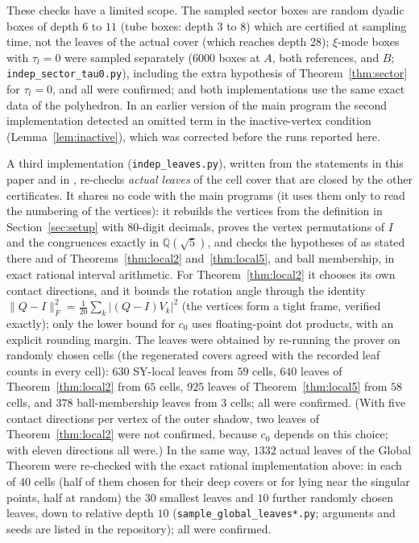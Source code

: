 \documentclass[11pt]{amsart}
\theoremstyle{definition}
\newcommand{\Q}{\mathbb{Q}}
\newcommand{\sq}{\sqrt5}
\newcommand{\abs}[1]{\lvert #1\rvert}
\newcommand{\norm}[1]{\lVert #1\rVert}
\begin{document}
These checks have a limited scope. The sampled sector boxes are random dyadic boxes of depth $6$ to $11$ (tube boxes:
depth $3$ to $8$) which are certified at sampling time, not the leaves of the actual cover (which reaches depth $28$); $\xi$-mode boxes with
$\tau_l=0$ were sampled separately ($6000$ boxes at $A$, both references, and $B$; \texttt{indep\_sector\_tau0.py}),
including the extra hypothesis of Theorem~\ref{thm:sector} for $\tau_l=0$, and all were confirmed;
and both implementations use the same exact data of the polyhedron. In an earlier
version of the main program the second implementation detected an omitted term in the inactive-vertex condition
(Lemma~\ref{lem:inactive}), which was corrected before the runs reported here.

A third implementation (\texttt{indep\_leaves.py}), written from the statements in this paper and in \cite{SY25}, re-checks
\emph{actual leaves} of the cell cover that are closed by the other certificates. It shares no code with the main programs
(it uses them only to read the numbering of the vertices): it rebuilds the vertices from the definition in
Section~\ref{sec:setup} with $80$-digit decimals, proves the vertex permutations of $I$ and the congruences exactly in
$\Q(\sq)$, and checks the hypotheses of \cite[Theorem 36]{SY25} as stated there and of Theorems~\ref{thm:local2}
and~\ref{thm:local5}, and ball membership, in exact rational interval arithmetic. For Theorem~\ref{thm:local2} it
chooses its own contact directions, and it bounds the rotation angle through the identity
$\norm{Q-I}_F^2=\frac1{20}\sum_k\abs{(Q-I)V_k}^2$ (the vertices form a tight frame, verified exactly); only the
lower bound for $c_0$ uses floating-point dot products, with an explicit rounding margin. The leaves were obtained by
re-running the prover on randomly chosen cells (the regenerated covers agreed with the recorded leaf counts in every cell):
$630$ SY-local leaves from $59$ cells, $640$ leaves of Theorem~\ref{thm:local2} from $65$ cells, $925$ leaves of
Theorem~\ref{thm:local5} from $58$ cells, and $378$ ball-membership leaves from $3$ cells; all were confirmed. (With
five contact directions per vertex of the outer shadow, two leaves of Theorem~\ref{thm:local2} were not confirmed,
because $c_0$ depends on this choice; with eleven directions all were.) In the same way, $1332$ actual leaves of the
Global Theorem were re-checked with the exact rational implementation above: in each of $40$ cells (half of them chosen
for their deep covers or for lying near the singular points, half at random) the $30$ smallest leaves and $10$ further
randomly chosen leaves, down to relative depth $10$ (\texttt{sample\_global\_leaves*.py}; arguments and seeds are
listed in the repository); all were confirmed.
\end{document}
